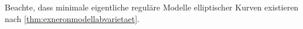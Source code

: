 \documentclass[german]{scrreprt}
\begin{document}
\begin{Satz}
  Beachte, dass minimale eigentliche reguläre Modelle elliptischer
  Kurven existieren nach \ref{thm:exneronmodellabvarietaet}.

\end{Satz}
\end{document}
